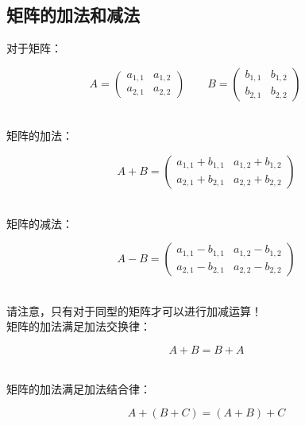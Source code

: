 \documentclass[UTF8]{ctexart}
\begin{document}
\subsection{矩阵的加法和减法}
    对于矩阵：
    \begin{large}
    \begin{equation*}
        A=
        \begin{pmatrix}
            a_{1,1}&a_{1,2}\\
            a_{2,1}&a_{2,2}
        \end{pmatrix}\qquad
        B=
        \begin{pmatrix}
            b_{1,1}&b_{1,2}\\
            b_{2,1}&b_{2,2}
        \end{pmatrix}\qquad
    \end{equation*}
    \end{large}\\
    矩阵的加法：
    \begin{large}
    \begin{equation*}
        A+B=
        \begin{pmatrix}
            a_{1,1}+b_{1,1}&a_{1,2}+b_{1,2}\\
            a_{2,1}+b_{2,1}&a_{2,2}+b_{2,2}
        \end{pmatrix}
    \end{equation*}
    \end{large}\\
    矩阵的减法：
    \begin{large}
    \begin{equation*}
        A-B=
        \begin{pmatrix}
            a_{1,1}-b_{1,1}&a_{1,2}-b_{1,2}\\
            a_{2,1}-b_{2,1}&a_{2,2}-b_{2,2}
        \end{pmatrix}
    \end{equation*}
    \end{large}\\
    请注意，只有对于同型的矩阵才可以进行加减运算！\\[6mm]
    矩阵的加法满足加法交换律：
    \begin{large}
    \begin{equation*}
        A+B=B+A
    \end{equation*}
    \end{large}\\
    矩阵的加法满足加法结合律：
    \begin{large}
    \begin{equation*}
        A+(B+C)=(A+B)+C
    \end{equation*}
    \end{large}
\end{document}
